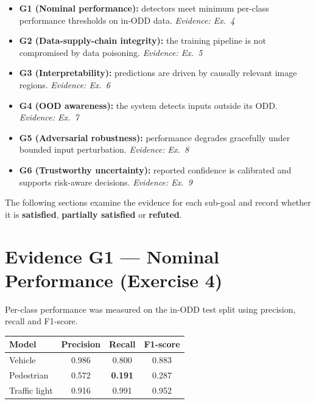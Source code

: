 \documentclass[11pt,a4paper]{article}
\begin{document}
\begin{itemize}[leftmargin=1.6em,itemsep=2pt]
  \item \textbf{G1 (Nominal performance):} detectors meet minimum per-class
        performance thresholds on in-ODD data. \hfill\emph{Evidence: Ex.~4}
  \item \textbf{G2 (Data-supply-chain integrity):} the training pipeline is not
        compromised by data poisoning. \hfill\emph{Evidence: Ex.~5}
  \item \textbf{G3 (Interpretability):} predictions are driven by causally
        relevant image regions. \hfill\emph{Evidence: Ex.~6}
  \item \textbf{G4 (OOD awareness):} the system detects inputs outside its ODD.
        \hfill\emph{Evidence: Ex.~7}
  \item \textbf{G5 (Adversarial robustness):} performance degrades gracefully
        under bounded input perturbation. \hfill\emph{Evidence: Ex.~8}
  \item \textbf{G6 (Trustworthy uncertainty):} reported confidence is calibrated
        and supports risk-aware decisions. \hfill\emph{Evidence: Ex.~9}
\end{itemize}

The following sections examine the evidence for each sub-goal and record whether
it is \textbf{satisfied}, \textbf{partially satisfied} or \textbf{refuted}.

\section{Evidence G1 --- Nominal Performance (Exercise 4)}
Per-class performance was measured on the in-ODD test split using precision,
recall and F1-score.

\begin{center}
\begin{tabular}{lccc}
\toprule
\textbf{Model} & \textbf{Precision} & \textbf{Recall} & \textbf{F1-score} \\
\midrule
Vehicle        & 0.986 & 0.800 & 0.883 \\
\rowcolor{warnred!12}
Pedestrian     & 0.572 & \textbf{0.191} & 0.287 \\
Traffic light  & 0.916 & 0.991 & 0.952 \\
\bottomrule
\end{tabular}
\end{center}
\end{document}
